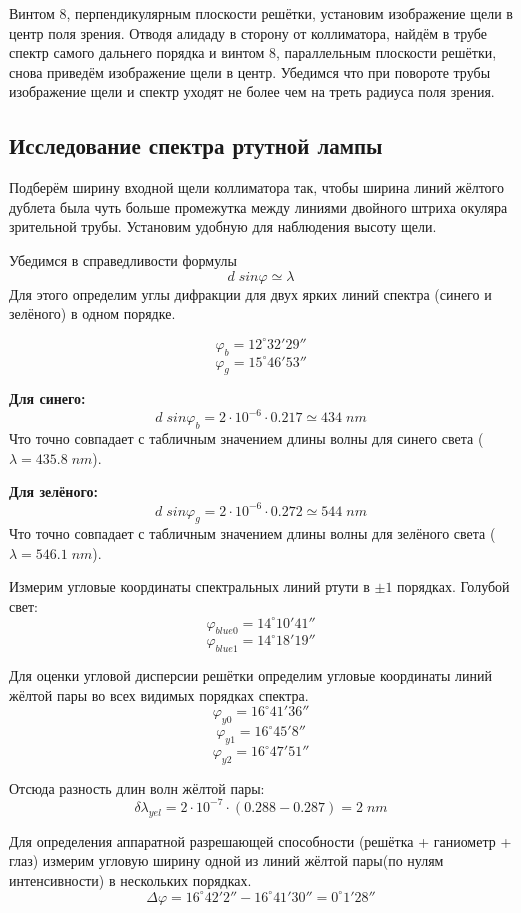 \documentclass{article}
\begin{document}
Винтом 8, перпендикулярным плоскости решётки, установим изображение щели в центр поля зрения. Отводя алидаду
в сторону от коллиматора, найдём в трубе спектр самого дальнего порядка и винтом 8, параллельным плоскости
решётки, снова приведём изображение щели в центр. Убедимся что при повороте трубы изображение щели и спектр
уходят не более чем на треть радиуса поля зрения.

\subsection{Исследование спектра ртутной лампы}
Подберём ширину входной щели коллиматора так, чтобы ширина линий жёлтого дублета была чуть больше промежутка
между линиями двойного штриха окуляра зрительной трубы. Установим удобную для наблюдения высоту щели.

Убедимся в справедливости формулы
\[ d\;sin\varphi \simeq \lambda \]
Для этого определим углы дифракции для двух ярких линий спектра (синего и зелёного) в одном порядке.

\[ \varphi_{b} = 12^{\circ}32'29'' \]
\[ \varphi_{g} = 15^{\circ}46'53'' \]

\textbf{Для синего:}
\[ d \; sin\varphi_{b} = 2\cdot 10^{-6} \cdot 0.217 \simeq 434\; nm  \]
Что точно совпадает с табличным значением длины волны для синего света (\(\lambda = 435.8\; nm\)).

\textbf{Для зелёного:}
\[ d \; sin\varphi_{g} = 2\cdot 10^{-6} \cdot 0.272 \simeq 544\; nm  \]
Что точно совпадает с табличным значением длины волны для зелёного света (\(\lambda = 546.1\; nm\)).

Измерим угловые координаты спектральных линий ртути в \(\pm 1\) порядках. Голубой свет: 
\[ \varphi_{blue0} = 14^{\circ}10'41'' \]
\[ \varphi_{blue1} = 14^{\circ}18'19'' \]

Для оценки угловой дисперсии решётки определим угловые координаты линий жёлтой пары во всех видимых
порядках спектра.
\[ \varphi_{y0} = 16^{\circ}41'36'' \]
\[ \varphi_{y1} = 16^{\circ}45'8'' \]
\[ \varphi_{y2} = 16^{\circ}47'51'' \]

Отсюда разность длин волн жёлтой пары:
\[ \delta\lambda_{yel} = 2\cdot 10^{-7} \cdot (0.288 - 0.287) = 2\; nm \]

Для определения аппаратной разрешающей способности (решётка + ганиометр + глаз) измерим угловую ширину
одной из линий жёлтой пары(по нулям интенсивности) в нескольких порядках.
\[ \Delta\varphi = 16^{\circ}42'2'' - 16 ^{\circ}41'30'' = 0^{\circ} 1'28'' \]
\end{document}
